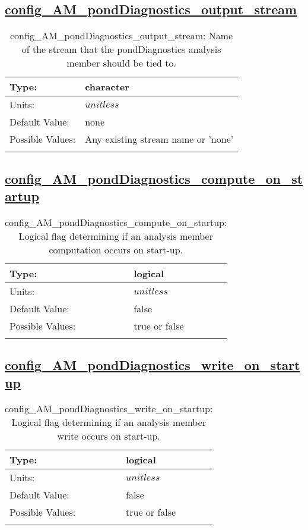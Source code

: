 \subsection[config\_AM\_pondDiagnostics\_output\_stream]{\hyperref[sec:nm_tab_AM_pondDiagnostics]{config\_AM\_pondDiagnostics\_output\_stream}}
\label{subsec:nm_sec_config_AM_pondDiagnostics_output_stream}
\begin{center}
\begin{longtable}{| p{2.0in} || p{4.0in} |}
    \hline
    Type: & character \\
    \hline
    Units: & $unitless$ \\
    \hline
    Default Value: & none \\
    \hline
    Possible Values: & Any existing stream name or 'none' \\
    \hline
    \caption{config\_AM\_pondDiagnostics\_output\_stream: Name of the stream that the pondDiagnostics analysis member should be tied to.}
\end{longtable}
\end{center}
\subsection[config\_AM\_pondDiagnostics\_compute\_on\_startup]{\hyperref[sec:nm_tab_AM_pondDiagnostics]{config\_AM\_pondDiagnostics\_compute\_on\_startup}}
\label{subsec:nm_sec_config_AM_pondDiagnostics_compute_on_startup}
\begin{center}
\begin{longtable}{| p{2.0in} || p{4.0in} |}
    \hline
    Type: & logical \\
    \hline
    Units: & $unitless$ \\
    \hline
    Default Value: & false \\
    \hline
    Possible Values: & true or false \\
    \hline
    \caption{config\_AM\_pondDiagnostics\_compute\_on\_startup: Logical flag determining if an analysis member computation occurs on start-up.}
\end{longtable}
\end{center}
\subsection[config\_AM\_pondDiagnostics\_write\_on\_startup]{\hyperref[sec:nm_tab_AM_pondDiagnostics]{config\_AM\_pondDiagnostics\_write\_on\_startup}}
\label{subsec:nm_sec_config_AM_pondDiagnostics_write_on_startup}
\begin{center}
\begin{longtable}{| p{2.0in} || p{4.0in} |}
    \hline
    Type: & logical \\
    \hline
    Units: & $unitless$ \\
    \hline
    Default Value: & false \\
    \hline
    Possible Values: & true or false \\
    \hline
    \caption{config\_AM\_pondDiagnostics\_write\_on\_startup: Logical flag determining if an analysis member write occurs on start-up.}
\end{longtable}
\end{center}
